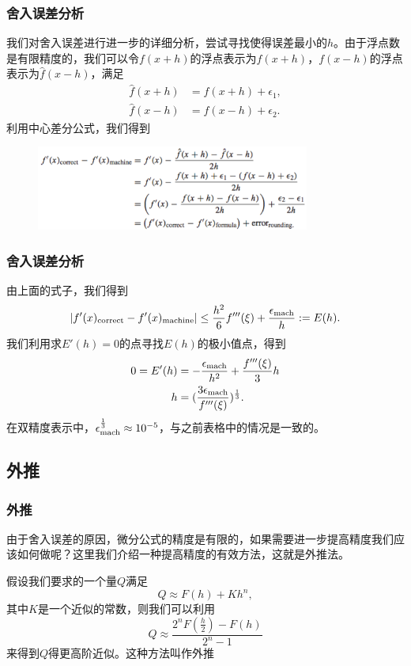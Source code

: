 \documentclass[10pt]{beamer}
\begin{document}
\begin{frame}
\frametitle{舍入误差分析}
我们对舍入误差进行进一步的详细分析，尝试寻找使得误差最小的$h$。由于浮点数是有限精度的，我们可以令$f(x+h)$的浮点表示为$\hat{f}(x+h)$，$f(x-h)$的浮点表示为$\hat{f}(x-h)$，满足
\begin{align}
\hat{f}(x+h) &= f(x+h) + \epsilon_1, \nonumber \\
\hat{f}(x-h) &= f(x-h) + \epsilon_2.
\end{align}
利用中心差分公式，我们得到
\begin{figure}
\includegraphics[width=9cm]{figs/5-1_Rounding_Error-2} 
\end{figure}
\end{frame}


\begin{frame}
\frametitle{舍入误差分析}
由上面的式子，我们得到
\begin{align}
 |f'(x)_{\rm{correct}} - f'(x)_{\rm{machine}}|  \le \frac{h^2}{6}f'''(\xi) + \frac{\epsilon_{\rm{mach}}}{h} := E(h).
\end{align}
我们利用求$E'(h)=0$的点寻找$E(h)$的极小值点，得到
\begin{align}
0 = E'(h) &= -\frac{\epsilon_{\rm{mach}}}{h^2} + \frac{f'''(\xi)}{3}h \nonumber \\
           h & = (\frac{3\epsilon_{\rm{mach}}}{f'''(\xi)})^{\frac{1}{3}}.
\end{align}
在双精度表示中，$\epsilon_{\rm{mach}}^{\frac{1}{3}} \approx 10^{-5}$，与之前表格中的情况是一致的。
\end{frame}



\subsection{外推}

\begin{frame}
\frametitle{外推}
由于舍入误差的原因，微分公式的精度是有限的，如果需要进一步提高精度我们应该如何做呢？这里我们介绍一种提高精度的有效方法，这就是外推法。

\vspace{0.2cm}

假设我们要求的一个量$Q$满足
\begin{equation}
Q \approx F(h) + K h^n ,
\end{equation}
其中$K$是一个近似的常数，则我们可以利用
\begin{equation}
\label{eq: extrapolation 1}
Q \approx \frac{2^n F(\frac{h}{2}) - F(h)}{2^n - 1}
\end{equation}
来得到$Q$得更高阶近似。这种方法叫作外推
\end{frame}
\end{document}
